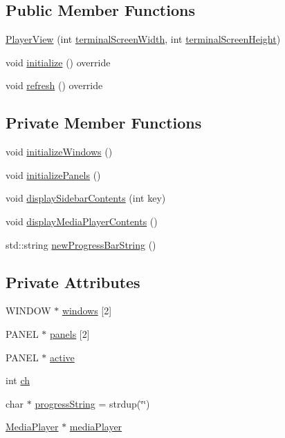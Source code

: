 \subsection*{Public Member Functions}
\begin{DoxyCompactItemize}
\item 
\mbox{\hyperlink{class_player_view_a946c4788207d5373e58890a2aa798580}{Player\+View}} (int \mbox{\hyperlink{class_view_a1f50d3146f942418e80b1085935e1a05}{terminal\+Screen\+Width}}, int \mbox{\hyperlink{class_view_a8ed04dfb61219cb59b8e77a2f90db244}{terminal\+Screen\+Height}})
\item 
void \mbox{\hyperlink{class_player_view_a8f41109707205d01009aab96f72d338f}{initialize}} () override
\item 
void \mbox{\hyperlink{class_player_view_aa0f641da279524437a48edbaf088414c}{refresh}} () override
\end{DoxyCompactItemize}
\subsection*{Private Member Functions}
\begin{DoxyCompactItemize}
\item 
void \mbox{\hyperlink{class_player_view_ae054992ef7cb944201aa643ca73327aa}{initialize\+Windows}} ()
\item 
void \mbox{\hyperlink{class_player_view_a769ddbf3fcd1c8cce93cf34eed62db29}{initialize\+Panels}} ()
\item 
void \mbox{\hyperlink{class_player_view_ab0056b8fbbab777cc0559425496f89c9}{display\+Sidebar\+Contents}} (int key)
\item 
void \mbox{\hyperlink{class_player_view_a1591b9bb3c762bc45af4aa2f35cb9c11}{display\+Media\+Player\+Contents}} ()
\item 
std\+::string \mbox{\hyperlink{class_player_view_aae1b5c77e61dfeebaa124b379206cfbc}{new\+Progress\+Bar\+String}} ()
\end{DoxyCompactItemize}
\subsection*{Private Attributes}
\begin{DoxyCompactItemize}
\item 
W\+I\+N\+D\+OW $\ast$ \mbox{\hyperlink{class_player_view_a79ed8edf0473ff2ae37e82a5c0bbb5d6}{windows}} \mbox{[}2\mbox{]}
\item 
P\+A\+N\+EL $\ast$ \mbox{\hyperlink{class_player_view_a15c3d2f862dc053fbb377c00e6b00c3a}{panels}} \mbox{[}2\mbox{]}
\item 
P\+A\+N\+EL $\ast$ \mbox{\hyperlink{class_player_view_ab62df18de9e4fa1ad686b5010914ff4f}{active}}
\item 
int \mbox{\hyperlink{class_player_view_a6e9e9e5e62de0af20a7d0d128698e848}{ch}}
\item 
char $\ast$ \mbox{\hyperlink{class_player_view_a40a4eee33d37840c0cc5937f7d583dab}{progress\+String}} = strdup(\char`\"{}\char`\"{})
\item 
\mbox{\hyperlink{class_media_player}{Media\+Player}} $\ast$ \mbox{\hyperlink{class_player_view_aaac93a2dff29c6032a7ed3980f16341c}{media\+Player}}
\end{DoxyCompactItemize}
